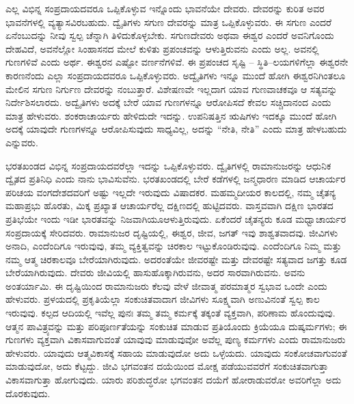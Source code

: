 ಎಲ್ಲ ವಿಭಿನ್ನ ಸಂಪ್ರದಾಯದವರೂ ಒಪ್ಪಿಕೊಳ್ಳುವ ಇನ್ನೊಂದು ಭಾವನೆಯೇ ದೇವರು. ದೇವರನ್ನು ಕುರಿತ ಅವರ ಭಾವನೆಗಳಲ್ಲಿ ವ್ಯತ್ಯಾಸವಿರಬಹುದು. ದ್ವೈತಿಗಳು ಸಗುಣ ದೇವರನ್ನು ಮಾತ್ರ ಒಪ್ಪಿಕೊಳ್ಳುವರು. ಈ ಸಗುಣ ಎಂದರೆ ಏನೆಂಬುದನ್ನು ನೀವು ಸ್ವಲ್ಪ ಚೆನ್ನಾಗಿ ತಿಳಿದುಕೊಳ್ಳಬೇಕು. ಸಗುಣದೇವರು ಅಥವಾ ಈಶ್ವರ ಎಂದರೆ ಅವನಿಗೊಂದು ದೇಹವಿದೆ, ಅವನೆಲ್ಲೋ ಸಿಂಹಾಸನದ ಮೇಲೆ ಕುಳಿತು ಪ್ರಪಂಚವನ್ನು ಆಳುತ್ತಿರುವನು ಎಂದು ಅಲ್ಲ. ಅವನಲ್ಲಿ ಗುಣಗಳಿವೆ ಎಂದು ಅರ್ಥ. ಈಶ್ವರನ ಎಷ್ಟೋ ವರ್ಣನೆಗಳಿವೆ. ಈ ಪ್ರಪಂಚದ ಸೃಷ್ಟಿ – ಸ್ಥಿತಿ–ಲಯಗಳಿಗೆಲ್ಲಾ ಈಶ್ವರನೇ ಕಾರಣನೆಂದು ಎಲ್ಲಾ ಸಂಪ್ರದಾಯದವರೂ ಒಪ್ಪಿಕೊಳ್ಳುವರು. ಅದ್ವೈತಿಗಳು ಇನ್ನೂ ಮುಂದೆ ಹೋಗಿ ಈಶ್ವರನಿಗಿಂತಲೂ ಮೇಲಿನ ಸಗುಣ ನಿರ್ಗುಣ ದೇವರನ್ನು ನಂಬುತ್ತಾರೆ. ವಿಶೇಷಣವೇ ಇಲ್ಲದಾಗ ಯಾವ ಗುಣವಾಚಕವೂ ಆ ಸತ್ಯವನ್ನು ನಿರ್ದೇಶಿಸಲಾರದು. ಅದ್ವೈತಿಗಳು ಅದಕ್ಕೆ ಬೇರೆ ಯಾವ ಗುಣಗಳನ್ನೂ ಆರೋಪಿಸದೆ ಕೇವಲ ಸಚ್ಚಿದಾನಂದ ಎಂದು ಮಾತ್ರ ಹೇಳುವರು. ಶಂಕರಾಚಾರ್ಯರು ಹೇಳಿದುದೇ ಇದನ್ನು. ಉಪನಿಷತ್ತಿನ ಋಷಿಗಳು ಇದಕ್ಕೂ ಮುಂದೆ ಹೋಗಿ ಅದಕ್ಕೆ ಯಾವುದೇ ಗುಣಗಳನ್ನೂ ಆರೋಪಿಸುವುದು ಸಾಧ್ಯವಿಲ್ಲ, ಅದನ್ನು “ನೇತಿ, ನೇತಿ” ಎಂದು ಮಾತ್ರ ಹೇಳಬಹುದು ಎನ್ನುವರು.

ಭರತಖಂಡದ ವಿಭಿನ್ನ ಸಂಪ್ರದಾಯದವರೆಲ್ಲಾ ಇದನ್ನು ಒಪ್ಪಿಕೊಳ್ಳುವರು. ದ್ವೈತಿಗಳಲ್ಲಿ ರಾಮಾನುಜರನ್ನು ಆಧುನಿಕ ದ್ವೈತದ ಪ್ರತಿನಿಧಿ ಎಂದು ನಾನು ಭಾವಿಸುವೆನು. ಭರತಖಂಡದಲ್ಲಿ ಬೇರೆ ಕಡೆಗಳಲ್ಲಿ ಜನ್ಮಧಾರಣ ಮಾಡಿದ ಆಚಾರ್ಯರ ಪರಿಚಯ ವಂಗದೇಶದವರಿಗೆ ಅಷ್ಟು ಇಲ್ಲದೇ ಇರುವುದು ವಿಷಾದಕರ. ಮಹಮ್ಮದೀಯರ ಕಾಲದಲ್ಲಿ, ನಮ್ಮ ಚೈತನ್ಯ ಮಹಾಪ್ರಭು ಹೊರತು, ಮಿಕ್ಕ ಪ್ರಖ್ಯಾತ ಆಚಾರ್ಯರೆಲ್ಲ ದಕ್ಷಿಣದಲ್ಲಿ ಹುಟ್ಟಿದವರು. ವಾಸ್ತವವಾಗಿ ದಕ್ಷಿಣ ಭಾರತದ ಪ್ರತಿಭೆಯೇ ಇಂದು ಇಡೀ ಭಾರತವನ್ನು ನಿಜವಾಗಿಯೂ\break ಆಳುತ್ತಿರುವುದು. ಏಕೆಂದರೆ ಚೈತನ್ಯರು ಕೂಡ ಮಧ್ವಾಚಾರ್ಯರ ಸಂಪ್ರ\-ದಾಯಕ್ಕೆ ಸೇರಿದವರು. ರಾಮಾನುಜರ ದೃಷ್ಟಿಯಲ್ಲಿ, ಈಶ್ವರ, ಜೀವ, ಜಗತ್​ ಇವು ಶಾಶ್ವತವಾದವು. ಜೀವಿಗಳು ಅನಾದಿ, ಎಂದೆಂದಿಗೂ ಇರುವುವು, ತಮ್ಮ ವ್ಯಕ್ತಿತ್ವವನ್ನು ಚಿರಕಾಲ ಇಟ್ಟುಕೊಂಡಿರುವುವು. ಎಂದೆಂದಿಗೂ ನಿಮ್ಮ ಮತ್ತು ನಮ್ಮ ಆತ್ಮ ಚಿರಕಾಲವೂ ಬೇರೆಯಾಗಿರುವುದು. ಅದರಂತೆಯೇ ಜೀವರಷ್ಟೇ ಮತ್ತು ದೇವರಷ್ಟೇ ಸತ್ಯವಾದ ಜಗತ್ತು ಕೂಡ ಬೇರೆಯಾಗಿರುವುದು. ದೇವರು ಜೀವಿಯಲ್ಲಿ ಹಾಸುಹೊಕ್ಕಾಗಿರುವನು, ಅದರ ಸಾರವಾಗಿರುವನು. ಅವನು ಅಂತರ್ಯಾಮಿ. ಈ ದೃಷ್ಟಿಯಿಂದ ರಾಮಾನುಜರು ಕೆಲವು ವೇಳೆ ಜೀವಾತ್ಮ ಪರಮಾತ್ಮರ ಸ್ವಭಾವ ಒಂದೇ ಎಂದು ಹೇಳುವರು. ಪ್ರಳಯದಲ್ಲಿ ಪ್ರಕೃತಿಯೆಲ್ಲಾ ಸಂಕುಚಿತವಾದಾಗ ಜೀವಿಗಳು ಸೂಕ್ಷ್ಮವಾಗಿ ಅಣುವಿನಂತೆ ಸ್ವಲ್ಪ ಕಾಲ ಇರುವುವು. ಕಲ್ಪದ ಆದಿಯಲ್ಲಿ ಇವೆಲ್ಲ ಪುನಃ ತಮ್ಮ ತಮ್ಮ ಕರ್ಮಕ್ಕೆ ತಕ್ಕಂತೆ ವ್ಯಕ್ತವಾಗಿ, ಪರಿಣಾಮ ಹೊಂದುವುವು. ಆತ್ಮನ ಪಾವಿತ್ರ್ಯವನ್ನು ಮತ್ತು ಪರಿಪೂರ್ಣತೆಯನ್ನು ಸಂಕುಚಿತ ಮಾಡುವ ಪ್ರತಿಯೊಂದು ಕ್ರಿಯೆಯೂ ದುಷ್ಕರ್ಮಗಳು; ಈ ಗುಣಗಳು ವ್ಯಕ್ತವಾಗಿ ವಿಕಾಸವಾಗುವಂತೆ ಯಾವುವು ಮಾಡುವುವೋ ಅವೆಲ್ಲ ಪುಣ್ಯ ಕರ್ಮಗಳು ಎಂದು ರಾಮಾನುಜರು ಹೇಳುವರು. ಯಾವುದು ಆತ್ಮವಿಕಾಸಕ್ಕೆ ಸಹಾಯ ಮಾಡುವುದೋ ಅದು ಒಳ್ಳೆಯದು. ಯಾವುದು ಸಂಕೋಚವಾಗುವಂತೆ ಮಾಡುವುದೋ, ಅದು ಕೆಟ್ಟದ್ದು. ಜೀವಿ ಭಗವಂತನ ದಯೆಯಿಂದ ಮೋಕ್ಷ ಪಡೆಯುವವರೆಗೆ ಸಂಕುಚಿತವಾಗುತ್ತಾ ವಿಕಾಸವಾಗುತ್ತಾ ಹೋಗುವುದು. ಯಾರು ಪರಿಶುದ್ಧರೋ ಭಗವಂತನ ದಯೆಗೆ ಹೋರಾಡುವರೋ ಅವರಿಗೆಲ್ಲಾ ಅದು ದೊರಕುವುದು.

\vskip 3pt

